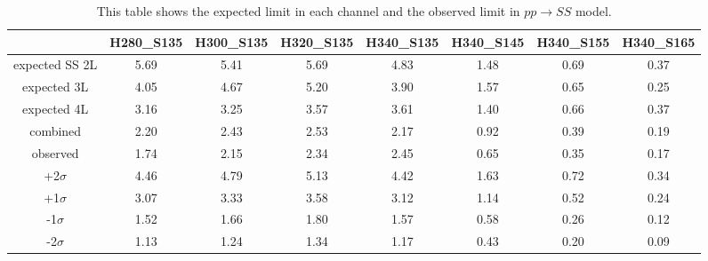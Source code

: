 \begin{table}
\scriptsize
  \centering
  \begin{tabular}{|c|c|c|c|c|c|c|c|}
  \hline
                &H280\_S135     &H300\_S135     &H320\_S135     &H340\_S135     &H340\_S145     &H340\_S155     &H340\_S165\\
\hline
expected SS 2L  &5.69   &5.41   &5.69   &4.83   &1.48   &0.69   &0.37   \\
\hline
expected 3L     &4.05   &4.67   &5.20   &3.90   &1.57   &0.65   &0.25   \\
\hline
expected 4L     &3.16   &3.25   &3.57   &3.61   &1.40   &0.66   &0.37   \\
\hline
combined        &2.20   &2.43   &2.53   &2.17   &0.92   &0.39   &0.19   \\
\hline
observed        &1.74   &2.15   &2.34   &2.45   &0.65   &0.35   &0.17   \\
\hline
+2$\sigma$     &4.46    &4.79   &5.13   &4.42   &1.63   &0.72   &0.34   \\
\hline
+1$\sigma$     &3.07    &3.33   &3.58   &3.12   &1.14   &0.52   &0.24   \\
\hline
-1$\sigma$     &1.52    &1.66   &1.80   &1.57   &0.58   &0.26   &0.12   \\
\hline
-2$\sigma$     &1.13    &1.24   &1.34   &1.17   &0.43   &0.20   &0.09   \\
\hline
  \end{tabular}
  \caption{This table shows the expected limit in each channel and the observed limit in $pp\rightarrow SS$ model.}
  \label{tab:limit-comb-SS}
\end{table}


